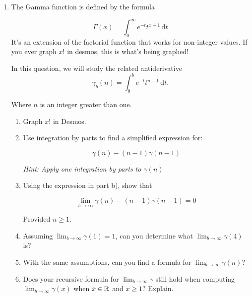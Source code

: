 \begin{enumerate}
    \newpage
    \item The Gamma function is defined by the formula 

    \[
        \Gamma(x) = \int_0^\infty e^{-t}t^{x-1}\,\mathrm dt
    \]
    It's an extension of the factorial function that works for non-integer values. If you ever graph $x!$ in desmos, this is what's being graphed!

    In this question, we will study the related antiderivative
    \[
        \gamma_b(n) = \int_0^b e^{-t}t^{n-1}\,\mathrm dt.
    \]
    

    Where $n$ is an integer greater than one.
    \begin{enumerate}
        \item Graph $x!$ in Desmos.
    
        \item Use integration by parts to find a simplified expression for:

        \[
            \gamma(n) - (n-1)\gamma(n-1) 
        \]

        \emph{Hint: Apply one integration by parts to $\gamma(n)$}
        \item Using the expression in part b), show that

        \[\lim_{b\to \infty} \gamma(n) - (n-1) \gamma(n-1) =0\]

        Provided $n\geq 1$.
        
        \item Assuming $\lim_{b\to \infty} \gamma(1) = 1$, can you determine what $\lim_{b\to \infty} \gamma(4)$ is?

        
        \item With the same assumptions, can you find a formula for $\lim_{b\to \infty}\gamma(n)$?
        \item Does your recursive formula for $\lim_{b\to \infty}\gamma$ still hold
        when computing $\lim_{b\to\infty}\gamma(x)$ when $x\in \mathbb{R}$ and $x\geq 1$? Explain.
    \end{enumerate}    
\end{enumerate}

















